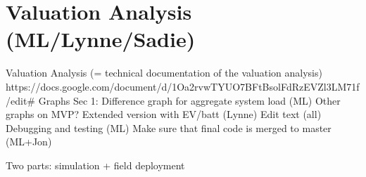 \chapter{Valuation Analysis (ML/Lynne/Sadie)}

Valuation Analysis (= technical documentation of the valuation analysis)
https://docs.google.com/document/d/1Oa2rvwTYUO7BFtBsolFdRzEVZl3LM71f/edit\#
Graphs
Sec 1: Difference graph for aggregate system load (ML)
Other graphs on MVP?
Extended version with EV/batt (Lynne)
Edit text (all)
Debugging and testing (ML)
Make sure that final code is merged to master (ML+Jon)

Two parts: simulation + field deployment
